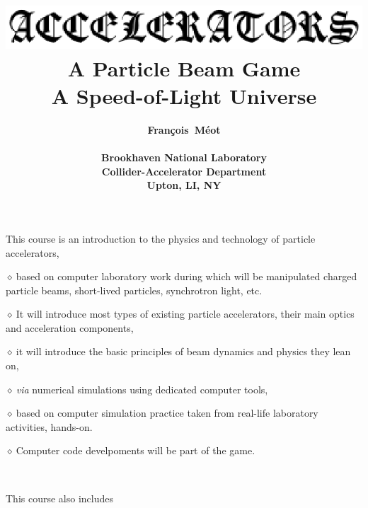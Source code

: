 \documentclass[12pt]{article}
\newcommand{\sid}{{\small \ensuremath{\diamond~}}}
\begin{document}
\thispagestyle{empty}




\title{
~ \\
\includegraphics[width=.9\linewidth]{accelerator.eps} \\
\fontsize{29pt}{34pt}\selectfont \bf
  A Particle Beam Game \\
 A  Speed-of-Light Universe
}


\author{ 
\Large \bf
 Fran\c{c}ois~M\'eot \\
~ \\
Brookhaven National Laboratory \\
Collider-Accelerator Department \\
 Upton, LI, NY
}

\date{}

\maketitle








\clearpage

\fontsize{18pt}{24pt}\selectfont \bf


This course is an introduction  to the physics and technology of particle accelerators, 

\sid based on computer laboratory work during which will be manipulated
  charged  particle beams, short-lived particles, synchrotron light, etc.

\sid It will introduce  most types of existing particle  accelerators, their main optics and acceleration components, 

\sid it will introduce  the basic principles of beam dynamics and physics they lean on, 

\sid \textsl{via} numerical simulations using dedicated computer tools, 

\sid based  on computer simulation practice taken from real-life laboratory activities, hands-on. 

\sid Computer code develpoments will be part of the game.


~

This course also includes 
\end{document}
